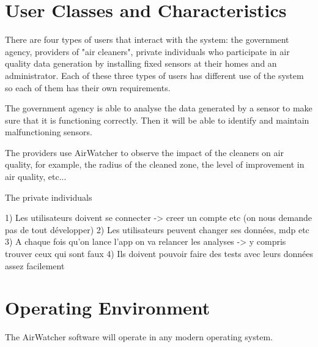 \documentclass{report}
\begin{document}

\section{User Classes and Characteristics}
There are four types of users that interact with the system: the government agency,
providers of "air cleaners", private individuals who participate in air quality
data generation by installing fixed sensors at their homes and an administrator.
Each of these three types of users has different use of the system so each of
them has their own requirements.

The government agency is able to analyse the data generated by a sensor to
make sure that it is functioning correctly. Then it will be able to identify
and maintain malfunctioning sensors.

The providers use AirWatcher to observe the impact of the cleaners on air
quality, for example, the radius of the cleaned zone, the level of improvement
in air quality, etc...

The private individuals

1) Les utilisateurs doivent se connecter -> creer un compte etc (on nous demande pas de tout développer)
2) Les utilisateurs peuvent changer ses données, mdp etc
3) A chaque fois qu'on lance l'app on va relancer les analyses -> y compris trouver ceux qui sont faux
4) Ils doivent pouvoir faire des tests avec leurs données assez facilement



\section{Operating Environment}
The AirWatcher software will operate in any modern operating system.
\end{document}

